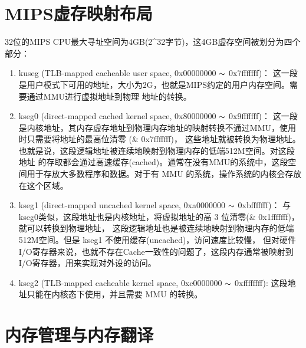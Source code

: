\section{MIPS虚存映射布局}

32位的MIPS CPU最大寻址空间为4GB(2\^{}32字节)，这4GB虚存空间被划分为四个部分：

\begin{enumerate}
  \item kuseg (TLB-mapped cacheable user space, 0x00000000 $\scriptsize{\sim}$ 0x7f\/f\/f\/f\/f\/f\/f)：
  这一段是用户模式下可用的地址，大小为2G，也就是MIPS约定的用户内存空间。需要通过MMU进行虚拟地址到物理
  地址的转换。
  \item kseg0 (direct-mapped cached kernel space, 0x80000000 $\scriptsize{\sim}$ 0x9f\/f\/f\/f\/f\/f\/f)：
  这一段是内核地址，其内存虚存地址到物理内存地址的映射转换不通过MMU，使用时只需要将地址的最高位清零
  (\& 0x7f\/f\/f\/f\/f\/f\/f)，
  这些地址就被转换为物理地址。也就是说，这段逻辑地址被连续地映射到物理内存的低端512M空间。对这段地址
  的存取都会通过高速缓存(cached)。通常在没有MMU的系统中，这段空间用于存放大多数程序和数据。对于有
  MMU 的系统，操作系统的内核会存放在这个区域。
  \item kseg1 (direct-mapped uncached kernel space, 0xa0000000 $\scriptsize{\sim}$ 0xbf\/f\/f\/f\/f\/f\/f)：
  与kseg0类似，这段地址也是内核地址，将虚拟地址的高 3 位清零(\& 0x1f\/f\/f\/f\/f\/f\/f)，就可以转换到物理地址，
  这段逻辑地址也是被连续地映射到物理内存的低端512M空间。但是 kseg1 不使用缓存(uncached)，访问速度比较慢，
  但对硬件I/O寄存器来说，也就不存在Cache一致性的问题了，这段内存通常被映射到I/O寄存器，用来实现对外设的访问。
  \item kseg2 (TLB-mapped cacheable kernel space, 0xc0000000 $\scriptsize{\sim}$ 0xf\/f\/f\/f\/f\/f\/f\/f):
  这段地址只能在内核态下使用，并且需要 MMU 的转换。
\end{enumerate}

\section{内存管理与内存翻译}

